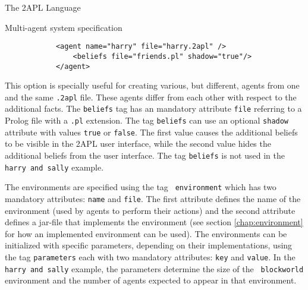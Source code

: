 \begin{chapter}{The 2APL Language}
\begin{section}{Multi-agent system specification}
        \begin{verbatim}
            <agent name="harry" file="harry.2apl" />
                <beliefs file="friends.pl" shadow="true"/>
            </agent>
        \end{verbatim}

        This option is specially useful for
        creating various, but different, agents from one and the same {\tt .2apl}
        file. These agents differ from each other with respect to the additional facts.
        The {\tt beliefs} tag has an mandatory attribute {\tt file}
        referring to a Prolog file with a {\tt .pl} extension. The
        tag {\tt beliefs} can use an optional {\tt shadow}
        attribute with values {\tt true} or {\tt false}. The first
        value causes the additional beliefs to be visible in the 2APL
        user interface, while the second value hides the additional beliefs
        from the user interface. The tag {\tt beliefs} is not used
        in the {\tt harry and sally} example.

        The environments are specified using the tag {\tt
        environment} which has two mandatory attributes: {\tt name} and
        {\tt file}. The first attribute defines the name of the
        environment (used by agents to perform their actions) and
        the second attribute defines a jar-file that implements the
        environment (see section \ref{chap:environment} for how an
        implemented environment can be used). The environments can be initialized with
        specific parameters, depending on their implementations, using
        the tag {\tt parameters} each with two mandatory attributes:
        {\tt key} and {\tt value}. In the {\tt harry and sally}
        example, the parameters determine the size of the {\tt
        blockworld} environment and the number of agents expected to
        appear in that environment.
    \end{section}



\end{chapter}
